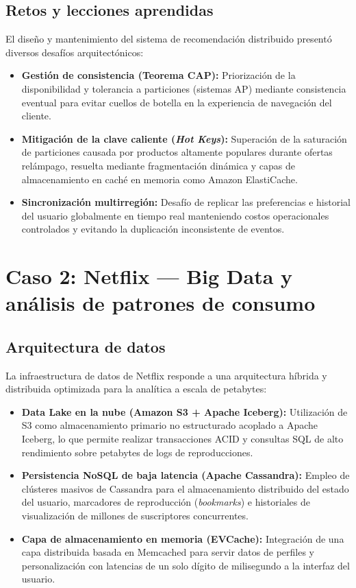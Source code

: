 \documentclass[12pt,a4paper]{article}
\begin{document}
\subsection{Retos y lecciones aprendidas}
El diseño y mantenimiento del sistema de recomendación distribuido presentó diversos desafíos arquitectónicos:
\begin{itemize}
    \item \textbf{Gestión de consistencia (Teorema CAP):} Priorización de la disponibilidad y tolerancia a particiones (sistemas AP) mediante consistencia eventual para evitar cuellos de botella en la experiencia de navegación del cliente.
    \item \textbf{Mitigación de la clave caliente (\textit{Hot Keys}):} Superación de la saturación de particiones causada por productos altamente populares durante ofertas relámpago, resuelta mediante fragmentación dinámica y capas de almacenamiento en caché en memoria como Amazon ElastiCache.
    \item \textbf{Sincronización multirregión:} Desafío de replicar las preferencias e historial del usuario globalmente en tiempo real manteniendo costos operacionales controlados y evitando la duplicación inconsistente de eventos.
\end{itemize}

\section{Caso 2: Netflix --- Big Data y análisis de patrones de consumo}

\subsection{Arquitectura de datos}
La infraestructura de datos de Netflix responde a una arquitectura híbrida y distribuida optimizada para la analítica a escala de petabytes:
\begin{itemize}
    \item \textbf{Data Lake en la nube (Amazon S3 + Apache Iceberg):} Utilización de S3 como almacenamiento primario no estructurado acoplado a Apache Iceberg, lo que permite realizar transacciones ACID y consultas SQL de alto rendimiento sobre petabytes de logs de reproducciones.
    \item \textbf{Persistencia NoSQL de baja latencia (Apache Cassandra):} Empleo de clústeres masivos de Cassandra para el almacenamiento distribuido del estado del usuario, marcadores de reproducción (\textit{bookmarks}) e historiales de visualización de millones de suscriptores concurrentes.
    \item \textbf{Capa de almacenamiento en memoria (EVCache):} Integración de una capa distribuida basada en Memcached para servir datos de perfiles y personalización con latencias de un solo dígito de milisegundo a la interfaz del usuario.
\end{itemize}
\end{document}
